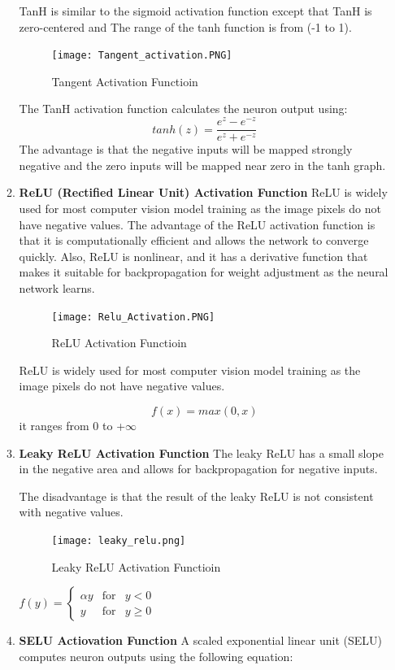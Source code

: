 \begin{itemize}
\begin{enumerate}
    TanH is similar to the sigmoid activation function except that TanH is zero-centered and The range of the tanh function is from (-1 to 1).
    
    \begin{figure}[H]
        \centering\texttt{[image: Tangent\_activation.PNG]}
        \caption{Tangent Activation Functioin}
    \end{figure}
    
    The TanH activation function calculates the neuron output using:\\
    $$tanh(z)=\frac{e^{z}-e^{-z}}{e^{z}+e^{-z}}$$
    The advantage is that the negative inputs will be mapped strongly negative and the zero inputs will be mapped near zero in the tanh graph.
    \item \textbf{ReLU (Rectified Linear Unit) Activation Function}
    ReLU is widely used for most computer vision model training as the image pixels do not have negative values. The advantage of the ReLU activation function is that it is computationally efficient and allows the network to converge quickly. Also, ReLU is nonlinear, and it has a derivative function that makes it suitable for backpropagation for weight adjustment as the neural network learns.
    
    \begin{figure}[H]
        \centering\texttt{[image: Relu\_Activation.PNG]}
        \caption{ReLU Activation Functioin}
    \end{figure}
    
    ReLU is widely used for most computer vision model training as the image pixels do not have negative values.
    
    $$f(x)=max(0,x)$$
    it ranges from 0 to +$\infty$\\
    \item  \textbf{Leaky ReLU Activation Function}
    The leaky ReLU has a small slope in the negative area and allows for backpropagation for negative inputs.
    
    The disadvantage is that the result of the leaky ReLU is not consistent with negative values.
    \begin{figure}[H]
        \centering\texttt{[image: leaky\_relu.png]}
        \caption{Leaky ReLU Activation Functioin}
    \end{figure}
    
    $f(y)=\left\{\begin{array}{rcl}
         \alpha y & \mbox{for} & y<0\\
         y & \mbox{for} & y\geq 0
    \end{array}\right.$\\
    \item \textbf{SELU Actiovation Function}
    A scaled exponential linear unit (SELU) computes neuron outputs using the following equation:
    

\end{enumerate}
\end{itemize}
